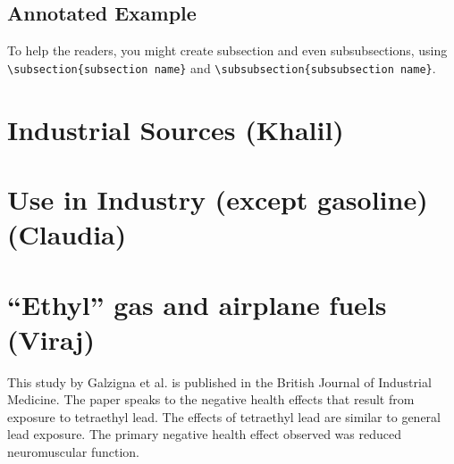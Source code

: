 \documentclass{article}\usepackage[]{graphicx}\usepackage[]{color}
\begin{document}
\subsection{Annotated Example}

\bigskip
\noindent %

\bigskip


To help the readers, you might create subsection and even subsubsections, using \verb!\subsection{subsection name}! and \verb!\subsubsection{subsubsection name}!. 


\section{Industrial Sources (Khalil)}


\section{Use in Industry (except gasoline) (Claudia)}

\section{``Ethyl'' gas and airplane fuels (Viraj)}


\bigskip

This study by Galzigna et al. is published in the British Journal of Industrial Medicine. The paper speaks to the negative health effects that result from exposure to tetraethyl lead. The effects of tetraethyl lead are similar to general lead exposure. The primary negative health effect observed was reduced neuromuscular function.

\bigskip

\end{document}
